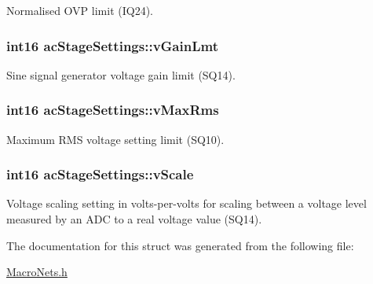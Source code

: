 Normalised O\-V\-P limit (I\-Q24). \hypertarget{a00004_ae3baa80fd1636154afd892c7362ca82c}{
\subsubsection[{v\-Gain\-Lmt}]{\setlength{\rightskip}{0pt plus 5cm}int16 ac\-Stage\-Settings\-::v\-Gain\-Lmt}}\label{a00004_ae3baa80fd1636154afd892c7362ca82c}
Sine signal generator voltage gain limit (S\-Q14). \hypertarget{a00004_ada3ef104bd8a8b682745bff081ec5ad7}{
\subsubsection[{v\-Max\-Rms}]{\setlength{\rightskip}{0pt plus 5cm}int16 ac\-Stage\-Settings\-::v\-Max\-Rms}}\label{a00004_ada3ef104bd8a8b682745bff081ec5ad7}
Maximum R\-M\-S voltage setting limit (S\-Q10). \hypertarget{a00004_ad5f818e5589d223d11291bce3a7b3089}{
\subsubsection[{v\-Scale}]{\setlength{\rightskip}{0pt plus 5cm}int16 ac\-Stage\-Settings\-::v\-Scale}}\label{a00004_ad5f818e5589d223d11291bce3a7b3089}
Voltage scaling setting in volts-\/per-\/volts for scaling between a voltage level measured by an A\-D\-C to a real voltage value (S\-Q14). 

The documentation for this struct was generated from the following file\-:\begin{DoxyCompactItemize}
\item 
\hyperlink{a00027}{Macro\-Nets.\-h}\end{DoxyCompactItemize}
